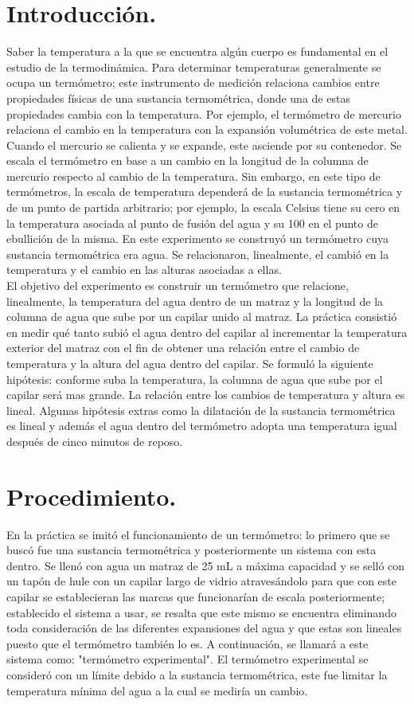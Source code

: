 \documentclass{article}
\begin{document}
\section*{Introducción.} 
Saber la temperatura a la que se encuentra algún cuerpo es fundamental en el estudio de la termodinámica. Para determinar temperaturas generalmente se ocupa un termómetro; este instrumento de medición relaciona cambios entre propiedades físicas de una sustancia termométrica, donde una de estas propiedades cambia con la temperatura. Por ejemplo, el termómetro de mercurio relaciona el cambio en la temperatura con la expansión volumétrica de este metal. Cuando el mercurio se calienta y se expande, este asciende por su contenedor. Se escala el termómetro en base a un cambio en la longitud de la columna de mercurio respecto al cambio de la temperatura. Sin embargo, en este tipo de termómetros, la escala de temperatura dependerá de la sustancia termométrica y de un punto de partida arbitrario; por ejemplo, la escala Celsius tiene su cero en la temperatura asociada al punto de fusión del agua y su 100 en el punto de ebullición de la misma. En este experimento se construyó un termómetro cuya sustancia termométrica era agua. Se relacionaron, linealmente, el cambió en la temperatura y el cambio en las alturas asociadas a ellas.\\ 
 El objetivo del experimento es construir un termómetro que relacione, linealmente, la temperatura del agua dentro de un matraz y la longitud de la columna de agua que sube por un capilar unido al matraz. La práctica consistió en medir qué tanto subió el agua dentro del capilar al incrementar la temperatura exterior del matraz con el fin de obtener una relación entre el cambio de temperatura y la altura del agua dentro del capilar.
 Se formuló la siguiente hipótesis: conforme suba la temperatura, la columna de agua que sube por el capilar será mas grande. La relación entre los cambios de temperatura y altura es lineal. Algunas hipótesis extras como la dilatación de la sustancia termométrica es lineal y además el agua dentro del termómetro adopta una temperatura igual después de cinco minutos de reposo.

\section*{Procedimiento.}
En la práctica se imitó el funcionamiento de un termómetro: lo primero que se buscó fue una sustancia termométrica y posteriormente un sistema con esta dentro. Se llenó con agua un matraz de 25 mL a máxima capacidad y se selló con un tapón de hule con un capilar largo de vidrio atravesándolo para que con este capilar se establecieran las marcas que funcionarían de escala posteriormente; establecido el sistema a usar, se resalta que este mismo se encuentra eliminando toda consideración de las diferentes expansiones del agua y que estas son lineales puesto que el termómetro también lo es.  A continuación, se llamará  a este sistema como: "termómetro experimental". El termómetro experimental se consideró con un límite debido a la sustancia termométrica, este fue limitar la temperatura mínima del agua a la cual se mediría un cambio.
\end{document}
